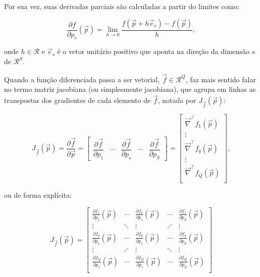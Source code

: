   \noindent Por sua vez, suas derivadas parciais são calculadas a partir do limites como:

  \begin{equation} \label{e:parcial_definicao}
    \frac{\partial f}{\partial p_s}(\vec{p}) =
      \lim_{h \to 0} \frac{
        f(\vec{p} + h \vec{e}_s) - f(\vec{p})
      }{h}
      ,
  \end{equation}

  \noindent onde $h \in \mathcal{R}$ e $\vec{e}_s$ é o vetor unitário positivo que aponta na direção da dimensão $s$ de $\mathcal{R}^S$.

  Quando a função diferenciada passa a ser vetorial, $\vec{f} \in \mathcal{R}^Q$, faz mais sentido falar no termo matriz jacobiana (ou simplesmente jacobiana), que agrupa em linhas as transpostas dos gradientes de cada elemento de $\vec{f}$, notada por $J_{\vec{f}}(\vec{p})$:

  \begin{equation} \label{e:del_definicao}
    J_{\vec{f}}(\vec{p}) =
      \dfrac{\partial \vec{f}}{\partial\vec{p}} =
      \begin{bmatrix}
        \dfrac{\partial \vec{f}}{\partial p_1} & \cdots & \dfrac{\partial \vec{f}}{\partial p_s} & \cdots & \dfrac{\partial \vec{f}}{\partial p_S}
      \end{bmatrix} =
      \begin{bmatrix}
        \vec{\nabla}^\top f_1(\vec{p}) \\
        \vdots \\
        \vec{\nabla}^\top f_q(\vec{p}) \\
        \vdots \\
        \vec{\nabla}^\top f_Q(\vec{p}) \\
      \end{bmatrix}
      ,
  \end{equation}

  \noindent ou de forma explícita:

    \begin{equation} \label{e:jacobiana_definicao_explicita}
      J_{\vec{f}}(\vec{p}) =
      \begin{bmatrix}
        \frac{\partial f_1}{\partial p_1}(\vec{p}) & \cdots & \frac{\partial f_1}{\partial p_s}(\vec{p}) & \cdots & \frac{\partial f_1}{\partial p_S}(\vec{p}) \\
        \vdots& \ddots& \vdots &\iddots &\vdots  \\
        \frac{\partial f_q}{\partial p_1}(\vec{p}) & \cdots & \frac{\partial f_q}{\partial p_s}(\vec{p}) & \cdots & \frac{\partial f_q}{\partial p_S}(\vec{p}) \\
        \vdots& \iddots& \vdots &\ddots &\vdots  \\
        \frac{\partial f_Q}{\partial p_1}(\vec{p}) & \cdots & \frac{\partial f_Q}{\partial p_s}(\vec{p}) & \cdots & \frac{\partial f_Q}{\partial p_S}(\vec{p}) \\
      \end{bmatrix}
    \end{equation}

